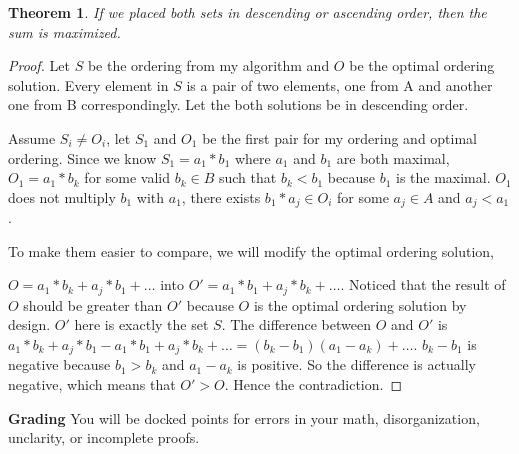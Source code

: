 \documentclass[paper=a4, fontsize=11pt]{scrartcl}
\newtheorem{theorem}{Theorem}
\numberwithin{equation}{section}		%
\numberwithin{figure}{section}			%
\numberwithin{table}{section}				%
\begin{document}
\begin{theorem}
	If we placed both sets in descending or ascending order, then the sum is maximized.
\end{theorem}

\begin{proof}
Let $S$ be the ordering from my algorithm and $O$ be the optimal ordering solution. Every element in $S$ is a pair of two elements, one from A and another one from B correspondingly. Let the both solutions be in descending order.

Assume $S_i \neq O_i$, let $S_1$ and $O_1$ be the first pair for my ordering and optimal ordering. Since we know $S_1 = a_1*b_1$ where $a_1$ and $b_1$ are both maximal, $O_1 = a_1 * b_k$ for some valid $b_k \in B$ such that $b_k < b_1$ because $b_1$ is the maximal. $O_1$ does not multiply $b_1$ with $a_1$, there exists $b_1 * a_j \in O_i$ for some $a_j \in A$ and $a_j < a_1$. 

To make them easier to compare, we will modify the optimal ordering solution, 

\noindent
$O = a_1*b_k + a_j*b_1 + \dots$ into $O' = a_1*b_1 + a_j*b_k + \dots$. Noticed that the result of $O$ should be greater than $O'$ because $O$ is the optimal ordering solution by design. $O'$ here is exactly the set $S$. The difference between $O$ and $O'$ is $a_1*b_k + a_j*b_1 - a_1*b_1 + a_j*b_k + \dots = (b_k - b_1)(a_1-a_k) + \dots$. $b_k - b_1$ is negative because $b_1 > b_k$ and $a_1 - a_k$ is positive. So the difference is actually negative, which means that $O' > O$. Hence the contradiction.
\end{proof}




\noindent\textbf{Grading} You will be docked points for errors in your math, disorganization, unclarity, or incomplete proofs. 
\end{document}

